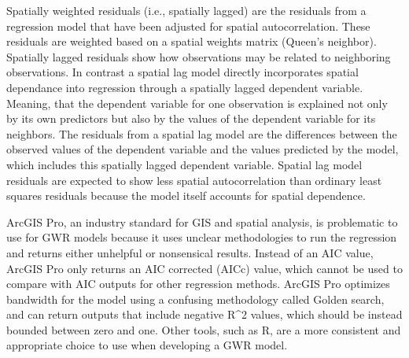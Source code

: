\documentclass[
]{article}
\begin{document}
Spatially weighted residuals (i.e., spatially lagged) are the residuals
from a regression model that have been adjusted for spatial
autocorrelation. These residuals are weighted based on a spatial weights
matrix (Queen's neighbor). Spatially lagged residuals show how
observations may be related to neighboring observations. In contrast a
spatial lag model directly incorporates spatial dependance into
regression through a spatially lagged dependent variable. Meaning, that
the dependent variable for one observation is explained not only by its
own predictors but also by the values of the dependent variable for its
neighbors. The residuals from a spatial lag model are the differences
between the observed values of the dependent variable and the values
predicted by the model, which includes this spatially lagged dependent
variable. Spatial lag model residuals are expected to show less spatial
autocorrelation than ordinary least squares residuals because the model
itself accounts for spatial dependence.

ArcGIS Pro, an industry standard for GIS and spatial analysis, is
problematic to use for GWR models because it uses unclear methodologies
to run the regression and returns either unhelpful or nonsensical
results. Instead of an AIC value, ArcGIS Pro only returns an AIC
corrected (AICc) value, which cannot be used to compare with AIC outputs
for other regression methods. ArcGIS Pro optimizes bandwidth for the
model using a confusing methodology called Golden search, and can return
outputs that include negative R\^{}2 values, which should be instead
bounded between zero and one. Other tools, such as R, are a more
consistent and appropriate choice to use when developing a GWR model.
\end{document}
